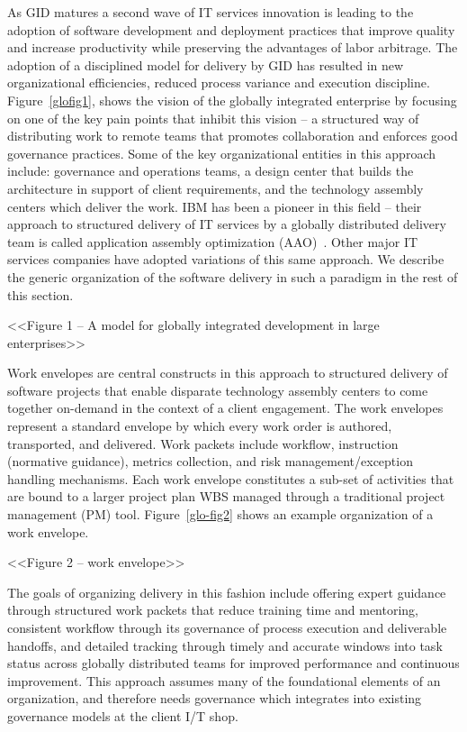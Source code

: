 As GID matures a second wave of IT services innovation is leading to the adoption of software development and deployment practices that improve quality and increase productivity while preserving the advantages of labor arbitrage.  The adoption of a disciplined model for delivery by GID has resulted in new organizational efficiencies, reduced process variance and execution discipline. Figure~\ref{glofig1}, shows the vision of the globally integrated enterprise by focusing on one of the key pain points that inhibit this vision – a structured way of distributing work to remote teams that promotes collaboration and enforces good governance practices.  Some of the key organizational entities in this approach include: governance and operations teams, a design center that builds the architecture in support of client requirements, and the technology assembly centers which deliver the work. IBM has been a pioneer in this field -- their approach to structured delivery of IT services by a globally distributed delivery team is called application assembly optimization (AAO)~\cite{gloaao}. Other major IT services companies have adopted variations of this same approach. We describe the generic organization of the software delivery in such a paradigm in the rest of this section.

<<Figure 1 -- A model for globally integrated development in large enterprises>>

Work envelopes are central constructs in this approach to structured delivery of software projects that enable disparate technology assembly centers to come together on-demand in the context of a client engagement.  The work envelopes represent a standard envelope by which every work order is authored, transported, and delivered. Work packets include workflow, instruction (normative guidance), metrics collection, and risk management/exception handling mechanisms. Each work envelope constitutes a sub-set of activities that are bound to a larger project plan WBS managed through a traditional project management (PM) tool. Figure~\ref{glo-fig2} shows an example organization of a work envelope.

<<Figure 2 -- work envelope>>

The goals of organizing delivery in this fashion include offering expert guidance through structured work packets that reduce training time and mentoring, consistent workflow through its governance of process execution and deliverable handoffs, and detailed tracking through timely and accurate windows into task status across globally distributed teams for improved performance and continuous improvement. This approach assumes many of the foundational elements of an organization, and therefore needs governance which integrates into existing governance models at the client I/T shop. 

